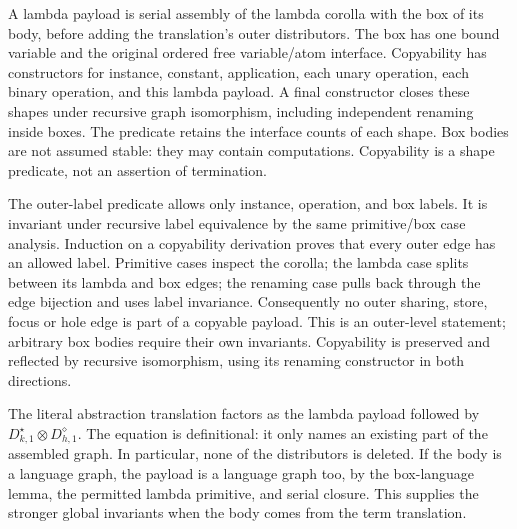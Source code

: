 A lambda payload is serial assembly of the lambda corolla with the box
of its body, before adding the translation's outer distributors. The box
has one bound variable and the original ordered free variable/atom interface.
Copyability has constructors for instance, constant, application, each unary
operation, each binary operation, and this lambda payload. A final constructor
closes these shapes under recursive graph isomorphism, including independent
renaming inside boxes. The predicate retains the interface counts of each
shape. Box bodies are not assumed stable: they may contain computations.
Copyability is a shape predicate, not an assertion of termination.



The outer-label predicate allows only instance, operation, and box labels.
It is invariant under recursive label equivalence by the same primitive/box
case analysis. Induction on a copyability derivation proves that every outer
edge has an allowed label. Primitive cases inspect the corolla; the lambda
case splits between its lambda and box edges; the renaming case pulls back
through the edge bijection and uses label invariance. Consequently no outer
sharing, store, focus or hole edge is part of a copyable payload. This is
an outer-level statement; arbitrary box bodies require their own invariants.
Copyability is preserved and reflected by recursive isomorphism, using its
renaming constructor in both directions.





The literal abstraction translation factors as the lambda payload followed
by $D^{\star}_{k,1}\otimes D^{\diamond}_{h,1}$. The equation is definitional:
it only names an existing part of the assembled graph. In particular,
none of the distributors is deleted. If the body is a language graph, the
payload is a language graph too, by the box-language lemma, the permitted
lambda primitive, and serial closure. This supplies the stronger global
invariants when the body comes from the term translation.

